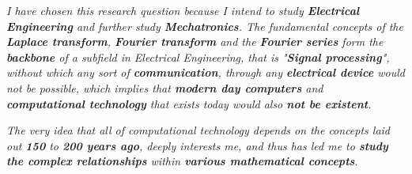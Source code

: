 

\textit{I have chosen this research question because I intend to study \textbf{Electrical Engineering} and further study \textbf{Mechatronics}. The fundamental concepts of the \textbf{Laplace transform}, \textbf{Fourier transform} and the \textbf{Fourier series} form the \textbf{backbone} of a subfield in Electrical Engineering, that is "\textbf{Signal processing}", without which any sort of \textbf{communication}, through any \textbf{electrical device} would not be possible, which implies that \textbf{modern day computers} and \textbf{computational technology} that exists today would also \textbf{not be existent}.}

\textit{The very idea that all of computational technology depends on the concepts laid out \textbf{150} to \textbf{200 years ago}, deeply interests me, and thus has led me to \textbf{study the complex relationships} within \textbf{various mathematical concepts}.}


